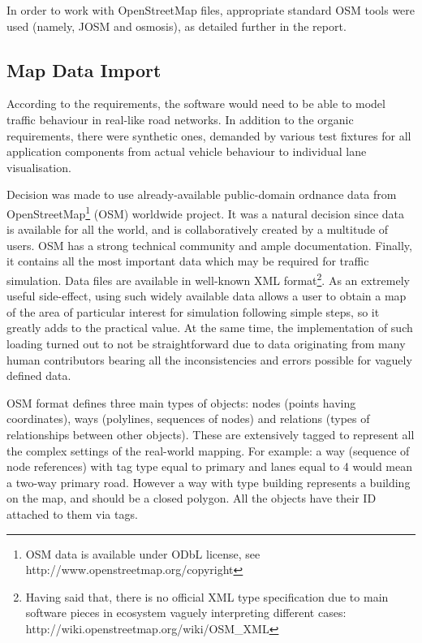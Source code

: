 In order to work with OpenStreetMap files, appropriate standard OSM tools were used (namely, JOSM and osmosis), as detailed further in the report.

\subsection{Map Data Import}
According to the requirements, the software would need to be able to model traffic behaviour in real-like road networks. In addition to the organic requirements, there were synthetic ones, demanded by various test fixtures for all application components from actual vehicle behaviour to individual lane visualisation.

Decision was made to use already-available public-domain ordnance data from OpenStreetMap\footnote{OSM data is available under ODbL license, see http://www.openstreetmap.org/copyright} (OSM)  worldwide project. It was a natural decision since data is available for all the world, and is collaboratively created by a multitude of users. OSM has a strong technical community and ample documentation. Finally, it contains all the most important data which may be required for traffic simulation. Data files are available in well-known XML format\footnote{Having said that, there is no official XML type specification due to main software pieces in ecosystem vaguely interpreting different cases: http://wiki.openstreetmap.org/wiki/OSM\_XML}. As an extremely useful side-effect, using such widely available data allows a user to obtain a map of the area of particular interest for simulation following simple steps, so it greatly adds to the practical value. At the same time, the implementation of such loading turned out to not be straightforward due to data originating from many human contributors bearing all the inconsistencies and errors possible for vaguely defined data.

OSM format defines three main types of objects: nodes (points having coordinates), ways (polylines, sequences of nodes) and relations (types of relationships between other objects). These are extensively tagged to represent all the complex settings of the real-world mapping. For example: a way (sequence of node references) with tag type equal to primary and lanes equal to 4 would mean a two-way primary road. However a way with type building represents a building on the map, and should be a closed polygon. All the objects have their ID attached to them via tags.

